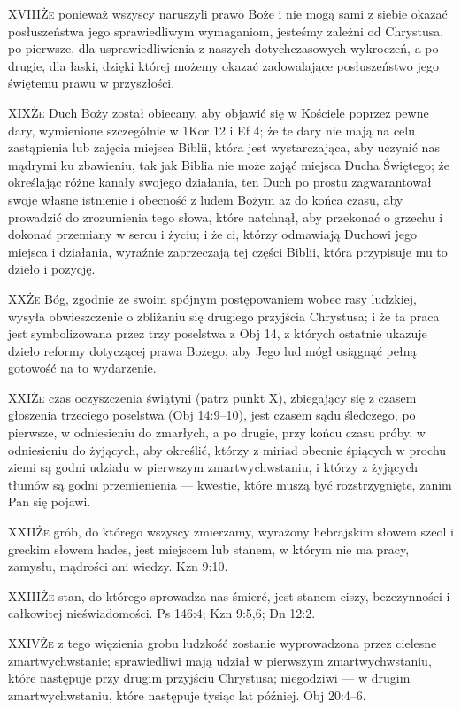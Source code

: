 \lettrine{XVIII}{Że} ponieważ wszyscy naruszyli prawo Boże i nie mogą sami z siebie okazać posłuszeństwa jego sprawiedliwym wymaganiom, jesteśmy zależni od Chrystusa, po pierwsze, dla usprawiedliwienia z naszych dotychczasowych wykroczeń, a po drugie, dla łaski, dzięki której możemy okazać zadowalające posłuszeństwo jego świętemu prawu w przyszłości.

\lettrine{XIX}{Że} Duch Boży został obiecany, aby objawić się w Kościele poprzez pewne dary, wymienione szczególnie w 1Kor 12 i Ef 4; że te dary nie mają na celu zastąpienia lub zajęcia miejsca Biblii, która jest wystarczająca, aby uczynić nas mądrymi ku zbawieniu, tak jak Biblia nie może zająć miejsca Ducha Świętego; że określając różne kanały swojego działania, ten Duch po prostu zagwarantował swoje własne istnienie i obecność z ludem Bożym aż do końca czasu, aby prowadzić do zrozumienia tego słowa, które natchnął, aby przekonać o grzechu i dokonać przemiany w sercu i życiu; i że ci, którzy odmawiają Duchowi jego miejsca i działania, wyraźnie zaprzeczają tej części Biblii, która przypisuje mu to dzieło i pozycję.

\lettrine{XX}{Że} Bóg, zgodnie ze swoim spójnym postępowaniem wobec rasy ludzkiej, wysyła obwieszczenie o zbliżaniu się drugiego przyjścia Chrystusa; i że ta praca jest symbolizowana przez trzy poselstwa z Obj 14, z których ostatnie ukazuje dzieło reformy dotyczącej prawa Bożego, aby Jego lud mógł osiągnąć pełną gotowość na to wydarzenie.

\lettrine{XXI}{Że} czas oczyszczenia świątyni (patrz punkt X), zbiegający się z czasem głoszenia trzeciego poselstwa (Obj 14:9--10), jest czasem sądu śledczego, po pierwsze, w odniesieniu do zmarłych, a po drugie, przy końcu czasu próby, w odniesieniu do żyjących, aby określić, którzy z miriad obecnie śpiących w prochu ziemi są godni udziału w pierwszym zmartwychwstaniu, i którzy z żyjących tłumów są godni przemienienia — kwestie, które muszą być rozstrzygnięte, zanim Pan się pojawi.

\lettrine{XXII}{Że} grób, do którego wszyscy zmierzamy, wyrażony hebrajskim słowem szeol i greckim słowem hades, jest miejscem lub stanem, w którym nie ma pracy, zamysłu, mądrości ani wiedzy. Kzn 9:10.

\lettrine{XXIII}{Że} stan, do którego sprowadza nas śmierć, jest stanem ciszy, bezczynności i całkowitej nieświadomości. Ps 146:4; Kzn 9:5,6; Dn 12:2.

\lettrine{XXIV}{Że} z tego więzienia grobu ludzkość zostanie wyprowadzona przez cielesne zmartwychwstanie; sprawiedliwi mają udział w pierwszym zmartwychwstaniu, które następuje przy drugim przyjściu Chrystusa; niegodziwi — w drugim zmartwychwstaniu, które następuje tysiąc lat później. Obj 20:4--6.

